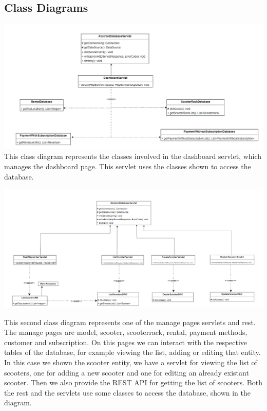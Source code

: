 \subsection{Class Diagrams}


\includegraphics[scale=0.5]{sections/DLL/dashboard-servlet_CD.png}
This class diagram represents the classes involved in the dashboard servlet, which manages the dashboard page.
This servlet uses the classes shown to access the database.


\includegraphics[scale=0.5]{sections/DLL/scooter-servlet-rest_CD.png}

This second class diagram represents one of the manage pages servlets and rest.
The manage pages are model, scooter, scooterrack, rental, payment methods, customer and subscription.
On this pages we can interact with the respective tables of the database, for example viewing the list, adding or editing that entity.
In this case we shown the scooter entity, we have a servlet for viewing the list of scooters, one for adding a new scooter and one for editing an already existant scooter.
Then we also provide the REST API for getting the list of scooters.
Both the rest and the servlets use some classes to access the database, shown in the diagram.